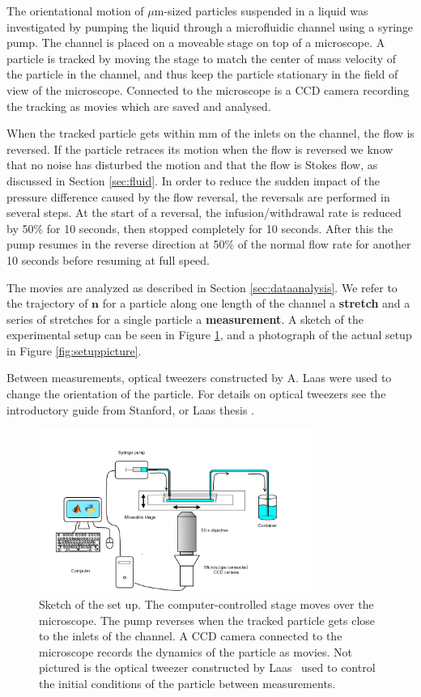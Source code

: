 \label{sec:exp_setup}
The orientational motion of $\mu$m-sized particles suspended in a liquid was investigated by pumping the liquid through a microfluidic channel using a syringe pump. The channel is placed on a moveable stage on top of a microscope. A particle is tracked by moving the stage to match the center of mass velocity of the particle in the channel, and thus keep the particle stationary in the field of view of the microscope. Connected to the microscope is a CCD camera recording the tracking as movies which are saved and analysed.

When the tracked particle gets within \unit[10]{mm} of the inlets on the channel, the flow is reversed. If the particle retraces its motion when the flow is reversed we know that no noise has disturbed the motion and that the flow is Stokes flow, as discussed in Section \ref{sec:fluid}. In order to reduce the sudden impact of the pressure difference caused by the flow reversal, the reversals are performed in several steps. At the start of a reversal, the infusion/withdrawal rate is reduced by 50\% for 10 seconds, then stopped completely for 10 seconds. After this the pump resumes in the reverse direction at 50\% of the normal flow rate for another 10 seconds before resuming at full speed. 

The movies are analyzed as described in Section \ref{sec:dataanalysis}. We refer to the trajectory of $\mathbf{n}$ for a particle along one length of the channel a \textbf{stretch} and a series of stretches for a single particle a \textbf{measurement}. A sketch of the experimental setup can be seen in Figure \ref{fig:setupsketch}, and a photograph of the actual setup in Figure \ref{fig:setuppicture}. 

Between measurements, optical tweezers constructed by A. Laas were used to change the orientation of the particle. For details on optical tweezers see the introductory guide from Stanford, \cite{OpticalTweezer} or Laas thesis \cite{alexanderThesis}. 


\begin{figure}[H]
\centering
\includegraphics[width=0.8\textwidth]{figures/method/setupsketch.png}
\caption{Sketch of the set up. The computer-controlled stage moves over the microscope. The pump reverses when the tracked particle gets close to the inlets of the channel. A CCD camera connected to the microscope records the dynamics of the particle as movies. Not pictured is the optical tweezer constructed by Laas~\cite{alexanderThesis} used to control the initial conditions of the particle between measurements.	\label{fig:setupsketch}}
\end{figure}

